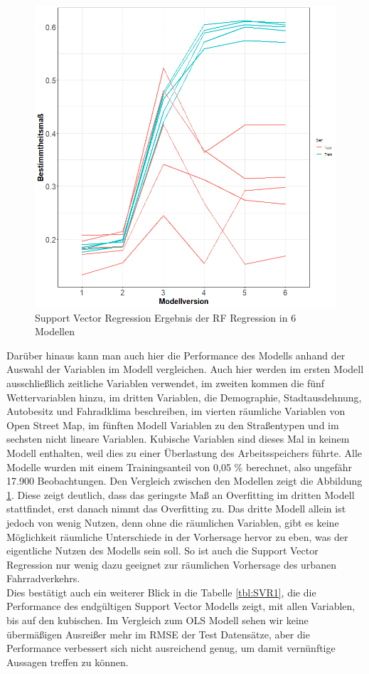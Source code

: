 \documentclass[a4paper,12pt]{thesis}
\begin{document}
\begin{figure}[!ht]
	\centering
	\includegraphics[width=\textwidth]{Plots/plot44.png}
	\caption{Support Vector Regression Ergebnis der RF Regression in 6 Modellen}
	\label{SVR_ModelSelection}
\end{figure}

Darüber hinaus kann man auch hier die Performance des Modells anhand der Auswahl der Variablen im Modell vergleichen. Auch hier werden im ersten Modell ausschließlich zeitliche Variablen verwendet, im zweiten kommen die fünf Wettervariablen hinzu, im dritten Variablen, die Demographie, Stadtausdehnung, Autobesitz und Fahradklima beschreiben, im vierten räumliche Variablen von Open Street Map, im fünften Modell Variablen zu den Straßentypen und im sechsten nicht lineare Variablen. Kubische Variablen sind dieses Mal in keinem Modell enthalten, weil dies zu einer Überlastung des Arbeitsspeichers führte. Alle Modelle wurden mit einem Trainingsanteil von 0,05 \% berechnet, also ungefähr 17.900 Beobachtungen. Den Vergleich zwischen den Modellen zeigt die Abbildung \ref{SVR_ModelSelection}. Diese zeigt deutlich, dass das geringste Maß an Overfitting im dritten Modell stattfindet, erst danach nimmt das Overfitting zu. Das dritte Modell allein ist jedoch von wenig Nutzen, denn ohne die räumlichen Variablen, gibt es keine Möglichkeit räumliche Unterschiede in der Vorhersage hervor zu eben, was der eigentliche Nutzen des Modells sein soll. So ist auch die Support Vector Regression nur wenig dazu geeignet zur räumlichen Vorhersage des urbanen Fahrradverkehrs.\\
Dies bestätigt auch ein weiterer Blick in die Tabelle \ref{tbl:SVR1}, die die Performance des endgültigen Support Vector Modells zeigt, mit allen Variablen, bis auf den kubischen. Im Vergleich zum OLS Modell sehen wir keine übermäßigen Ausreißer mehr im RMSE der Test Datensätze, aber die Performance verbessert sich nicht ausreichend genug, um damit vernünftige Aussagen treffen zu können.
\end{document}

